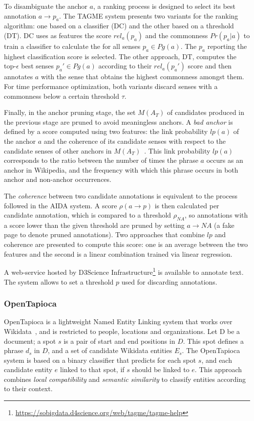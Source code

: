 To disambiguate the anchor $a$, a ranking process is designed to select its best annotation 
$a \rightarrow p_a$. The TAGME system presents two variants for the ranking algorithm: one based 
on a classifier (DC) and the other based on a threshold (DT). DC uses as features the score 
$rel_a(p_a)$ and the commonness $Pr(p_a|a)$ to train a classifier to calculate the 
 for all senses $p_a \in Pg(a)$. The $p_a$ 
reporting the highest classification score is selected. The other approach, DT, computes the 
top-$\epsilon$ best senses $p_a' \in Pg(a)$ according to their $rel_a(p_a')$ score and then 
annotates $a$ with the sense that obtains the highest commonness amongst them. For time 
performance optimization, both variants discard senses with a commonness below a certain 
threshold $\tau$.

Finally, in the anchor pruning stage, the set $M(A_T)$ of candidates produced in the previous 
stage are pruned to avoid meaningless anchors. A \textit{bad anchor} is defined by a score 
computed using two features: the link probability $lp(a)$ of the anchor $a$ and the coherence of 
its candidate senses with respect to the candidate senses of other anchors in 
$M(A_T)$~\cite{infExtr:MilneW08}. This link probability $lp(a)$ corresponds to the ratio between 
the number of times the phrase $a$ occurs as an anchor in Wikipedia, and the frequency with which 
this phrase occurs in both anchor and non-anchor occurrences.

The \textit{coherence} between two candidate annotations is equivalent to the process followed 
in the AIDA system. A score $\rho(a \rightarrow p)$ is then calculated per candidate annotation, 
which is compared to a threshold $\rho_{NA}$, so annotations with a score lower than the given 
threshold are pruned by setting $a \rightarrow NA$ (a fake page to denote pruned annotations). 
Two approaches that combine $lp$ and coherence are presented to compute this score: one is an 
average between the two features and the second is a linear combination trained via linear 
regression.

A web-service hosted by D3Science Infrastructure\footnote{\url{https://sobigdata.d4science.org/web/tagme/tagme-help}} 
is available to annotate text. The system allows to set a threshold $p$ used for discarding 
annotations.

\subsubsection{OpenTapioca}
\label{cap2:theoFrame/infExtr/entityLinking/openTapioca}
OpenTapioca is a lightweight Named Entity Linking system that works over 
Wikidata~\cite{EL:opentapioca-Delpeuch19}, and is restricted to people, locations and 
organizations. Let D be a document; a spot $s$ is a pair of start and end positions in $D$. 
This spot defines a phrase $d_s$ in $D$, and a set of candidate Wikidata entities $E_s$. The 
OpenTapioca system is based on a binary classifier that predicts for each spot $s$, and each 
candidate entity $e$ linked to that spot, if $s$ should be linked to $e$. This approach 
combines \textit{local compatibility} and \textit{semantic similarity} to classify entities 
according to their context.


